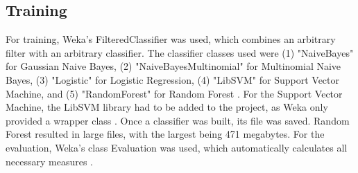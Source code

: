 \subsection{Training}
For training, Weka's FilteredClassifier was used, which combines an arbitrary filter with an arbitrary classifier. The classifier classes used were (1) "NaiveBayes" for Gaussian Naive Bayes, (2) "NaiveBayesMultinomial" for Multinomial Naive Bayes, (3) "Logistic" for Logistic Regression, (4) "LibSVM" for Support Vector Machine, and (5) "RandomForest" for Random Forest \cite{Weka}. For the Support Vector Machine, the LibSVM library had to be added to the project, as Weka only provided a wrapper class \cite{Chang2001}. Once a classifier was built, its file was saved. Random Forest resulted in large files, with the largest being 471 megabytes. For the evaluation, Weka's class Evaluation was used, which automatically calculates all necessary measures \cite{Weka}.